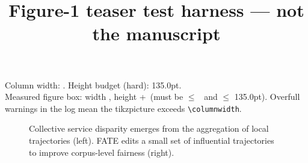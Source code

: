 \documentclass[sigconf,review,anonymous]{acmart}
\begin{document}
\title{Figure-1 teaser test harness --- not the manuscript}
\maketitle

\newsavebox{\figbox}
\sbox{\figbox}{}

\noindent Column width: \the\columnwidth. Height budget (hard):
135.0pt.\\
Measured figure box: width \the\wd\figbox, height
\the\dimexpr\ht\figbox+\dp\figbox\relax\ (must be
$\le$ \the\columnwidth\ and $\le$ 135.0pt).
Overfull warnings in the log mean the tikzpicture exceeds
\verb|\columnwidth|.

\begin{figure}[h]
  \centering
  \usebox{\figbox}
  \caption{Collective service disparity emerges from the aggregation of
  local trajectories (left). FATE edits a small set of influential
  trajectories to improve corpus-level fairness (right).}
\end{figure}
\end{document}
